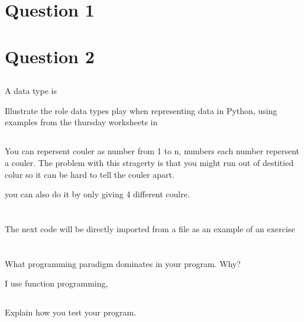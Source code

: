 \documentclass{article}
\begin{document}
\section{Question 1}


\section{Question 2}


\subsection{}
A data type is 

Illustrate the role data types play when representing data in Python, using examples from the thursday worksheets in 


\subsection{}

You can repersent couler as number from 1 to n, numbers each number repersent a couler. The problem with this stragerty is that you might run out of destitied colur so it can be hard to tell the couler apart.  


you can also do it by only giving 4 different coulre. 



\newpage

\section{}






The next code will be directly imported from a file as an example of an exercise








\section{}

\subsection{}


\subsection{}

What programming paradigm dominates in your program. Why?

I use function programming, 


\subsection{}

Explain how you test your program.


\section{}

\subsection{}
\end{document}
